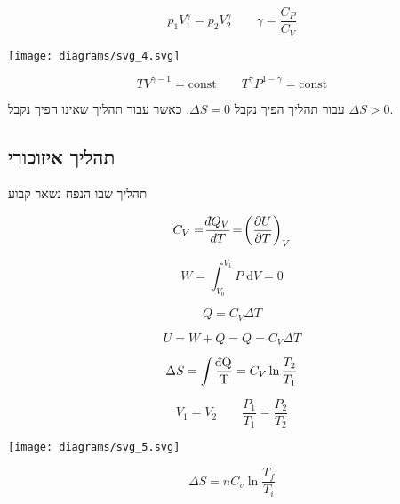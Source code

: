 \documentclass{tstextbook}
\begin{document}
\begin{proposition}
$$p_{1}V_{1}^\gamma=p_{2}V_{2}^\gamma \qquad \gamma = \frac{C_{P}}{C_{V}}$$

\end{proposition}
\texttt{[image: diagrams/svg\_4.svg]}
\begin{proposition}
$$TV^{\gamma-1}=\mathrm{const}\qquad T^\gamma P^{1-\gamma}=\mathrm{const}$$

\end{proposition}
\begin{proposition}
עבור תהליך הפיך נקבל \(\Delta S = 0\). כאשר עבור תהליך שאינו הפיך נקבל \(\Delta S > 0\).

\end{proposition}
\subsection{תהליך איזוכורי}

\begin{definition}
תהליך שבו הנפח נשאר קבוע

\end{definition}
\begin{proposition}
$$C_{V}=\!\frac{\;\bar{}\mkern-7.5mu dQ_{V}}{d T}\!=\!\left(\frac{\partial U}{\partial T}\right)_{V}$$

\end{proposition}
\begin{proposition}
$$W=\int_{V_{0}}^{V_{1}} P \;\mathrm{d}V=0$$

\end{proposition}
\begin{proposition}
$$Q=C_{V}\Delta T$$

\end{proposition}
\begin{proposition}
$$U=W+Q = Q=C_{V}\Delta T$$

\end{proposition}
\begin{proposition}
$$\Delta S = \int \mathrm{\frac{\;\bar{}\mkern-7.5mu dQ}{T}}=C_{V}\ln \frac{T_{2}}{T_{1}}$$

\end{proposition}
\begin{proposition}
$$V_{1} = V_{2}\qquad  \frac{P_{1}}{T_{1}}=\frac{P_{2}}{T_{2}}$$

\end{proposition}
\texttt{[image: diagrams/svg\_5.svg]}
\begin{proposition}
$$\Delta S=n C_{v}\ln{\frac{T_{f}}{T_{i}}}$$

\end{proposition}
\end{document}
